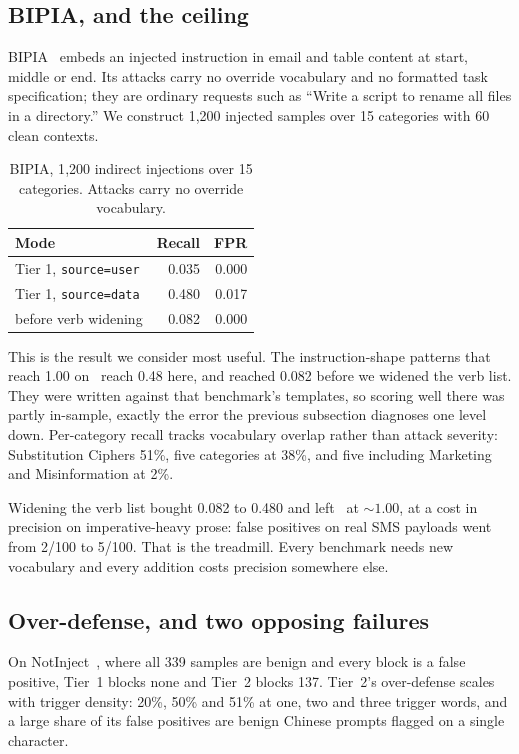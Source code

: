 \documentclass[sigconf,anonymous,review]{acmart}
\begin{document}
\subsection{BIPIA, and the ceiling}

BIPIA~\cite{yi2023bipia} embeds an injected instruction in email and table
content at start, middle or end. Its attacks carry no override vocabulary and no
formatted task specification; they are ordinary requests such as ``Write a script
to rename all files in a directory.'' We construct 1{,}200 injected samples over
15 categories with 60 clean contexts.

\begin{table}[t]
\caption{BIPIA, 1{,}200 indirect injections over 15 categories. Attacks carry no
override vocabulary.}
\label{tab:bipia}
\small
\begin{tabular}{lrr}
\toprule
Mode & Recall & FPR \\
\midrule
Tier 1, \texttt{source=user} & 0.035 & 0.000 \\
Tier 1, \texttt{source=data} & 0.480 & 0.017 \\
\quad before verb widening   & 0.082 & 0.000 \\
\bottomrule
\end{tabular}
\end{table}

This is the result we consider most useful. The instruction-shape patterns that
reach 1.00 on~\cite{liu2024formalizing} reach 0.48 here, and reached 0.082 before
we widened the verb list. They were written against that benchmark's templates,
so scoring well there was partly in-sample, exactly the error the previous
subsection diagnoses one level down. Per-category recall tracks vocabulary
overlap rather than attack severity: Substitution Ciphers 51\%, five categories
at 38\%, and five including Marketing and Misinformation at 2\%.

Widening the verb list bought 0.082 to 0.480 and left~\cite{liu2024formalizing}
at ${\sim}1.00$, at a cost in precision on imperative-heavy prose: false
positives on real SMS payloads went from 2/100 to 5/100. That is the treadmill.
Every benchmark needs new vocabulary and every addition costs precision somewhere
else.

\subsection{Over-defense, and two opposing failures}

On NotInject~\cite{li2024injecguard}, where all 339 samples are benign and every
block is a false positive, Tier~1 blocks none and Tier~2 blocks 137. Tier~2's
over-defense scales with trigger density: 20\%, 50\% and 51\% at one, two and
three trigger words, and a large share of its false positives are benign Chinese
prompts flagged on a single character.
\end{document}
